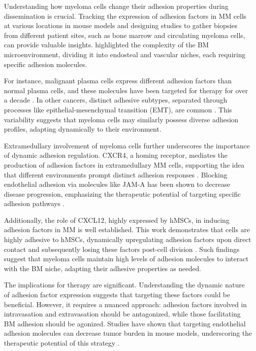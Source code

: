 Understanding how myeloma cells change their adhesion properties during
dissemination is crucial. Tracking the expression of adhesion factors in MM
cells at various locations in mouse models and designing studies to gather
biopsies from different patient sites, such as bone marrow and circulating
myeloma cells, can provide valuable insights.
\citet{bouzerdanAdhesionMoleculesMultiple2022} highlighted the complexity of the
BM microenvironment, dividing it into endosteal and vascular niches, each
requiring specific adhesion molecules.

For instance, malignant plasma cells express different adhesion factors than
normal plasma cells, and these molecules have been targeted for therapy for over
a decade \cite{cookRoleAdhesionMolecules1997,
bouzerdanAdhesionMoleculesMultiple2022, nairChapterSixEmerging2012}. In other
cancers, distinct adhesive subtypes, separated through processes like
epithelial-mesenchymal transition (EMT), are common
\cite{gengDynamicSwitchTwo2014}. This variability suggests that myeloma cells
may similarly possess diverse adhesion profiles, adapting dynamically to their
environment.

Extramedullary involvement of myeloma cells further underscores the importance
of dynamic adhesion regulation. CXCR4, a homing receptor, mediates the
production of adhesion factors in extramedullary MM cells, supporting the idea
that different environments prompt distinct adhesion responses
\cite{roccaroCXCR4RegulatesExtraMedullary2015}. Blocking endothelial adhesion
via molecules like JAM-A has been shown to decrease disease progression,
emphasizing the therapeutic potential of targeting specific adhesion pathways
\cite{solimandoHaltingViciousCycle2020}.

Additionally, the role of CXCL12, highly expressed by \acp{hMSC}, in inducing
adhesion factors in MM is well established. This work demonstrates that 
cells are highly adhesive to \acp{hMSC}, dynamically upregulating adhesion
factors upon direct contact and subsequently losing these factors post-cell
division \cite{ullahRoleCXCR4Multiple2019, burgerGp130RasMediated2001,
chatterjeePresenceBoneMarrow2002}. Such findings suggest that myeloma cells
maintain high levels of adhesion molecules to interact with the BM niche,
adapting their adhesive properties as needed.

The implications for therapy are significant. Understanding the dynamic nature
of adhesion factor expression suggests that targeting these factors could be
beneficial. However, it requires a nuanced approach: adhesion factors involved
in intravasation and extravasation should be antagonized, while those
facilitating BM adhesion should be agonized. Studies have shown that targeting
endothelial adhesion molecules can decrease tumor burden in mouse models,
underscoring the therapeutic potential of this strategy
\cite{asosinghUniquePathwayHoming2001a,
mrozikTherapeuticTargetingNcadherin2015}.

